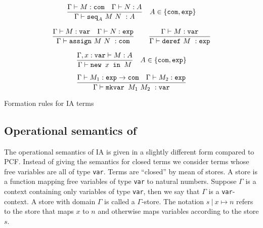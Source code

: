 \begin{table}[htbp]
$$ \frac{\displaystyle \Gamma \vdash M : \texttt{com} \quad \Gamma \vdash N :A}{\Gamma \vdash \texttt{seq}_A \ M\ N\ : A} \quad A \in \{ \texttt{com}, \texttt{exp}\}$$

$$ \frac{\displaystyle \Gamma \vdash M : \texttt{var} \quad \Gamma \vdash N : \texttt{exp}}{\Gamma \vdash \texttt{assign}\ M\ N\ : \texttt{com}}
\qquad
 \frac{\displaystyle \Gamma \vdash M : \texttt{var}}{\Gamma \vdash \texttt{deref}\ M\ : \texttt{exp}}$$

$$ \frac{\displaystyle \Gamma, x : \texttt{var} \vdash M : A}{\Gamma \vdash \texttt{new } x \texttt{ in } M} \quad A \in \{ \texttt{com}, \texttt{exp}\}$$

$$ \frac{\displaystyle \Gamma \vdash M_1 : \texttt{exp} \rightarrow \texttt{com} \quad \Gamma \vdash M_2 : \texttt{exp}}{\Gamma \vdash \texttt{mkvar } M_1\ M_2\ : \texttt{var}}$$

\caption{Formation rules for IA terms}
\label{tab:ia_formrules}
\end{table}


\subsection{Operational semantics of \ialgol}

The operational semantics of IA is given in a slightly different form compared to PCF.
Instead of giving the semantics for closed terms we consider terms
whose free variables are all of type \texttt{var}. Terms are
``closed'' by mean of stores. A store is a function mapping free
variables of type \texttt{var} to natural numbers. Suppose $\Gamma$
is a context containing only variables of type \texttt{var}, then we
say that $\Gamma$ is a \texttt{var}-context. A store with domain
$\Gamma$ is called a $\Gamma$-store. The notation $s\ |\ x \mapsto
n$ refers to the store that maps $x$ to $n$ and otherwise maps
variables according to the store $s$.

%


